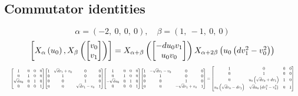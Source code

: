 \documentclass[11pt]{article}
\theoremstyle{definition}
\begin{document}
\subsection{Commutator identities}

\providecommand{\scaletoalign}[2]{%
  \sbox0{$#2$}%
  \ifdim\wd0>#1\relax 
    \resizebox{#1}{!}{\usebox0}%
  \else 
    \usebox0%
  \fi 
}
\[
\alpha = \left( -2, \  0, \  0, \  0\right), \quad \beta = \left( 1, \  -1, \  0, \  0\right)
\]
\[
\scaletoalign{\textwidth}{\left[ X_{\alpha}\left(u_{0}\right), X_{\beta}\left(\left[\begin{matrix}v_{0}\\v_{1}\end{matrix}\right]\right) \right] = X_{\alpha + \beta}\left(\left[\begin{matrix}- d u_{0} v_{1}\\u_{0} v_{0}\end{matrix}\right]\right) X_{\alpha + 2\beta}\left(u_{0} \left(d v_{1}^{2} - v_{0}^{2}\right)\right)}
\]
\[
\scaletoalign{\textwidth}{{\left[\begin{matrix}1 & 0 & 0 & 0\\0 & 1 & 0 & 0\\\sqrt{d} u_{0} & 0 & 1 & 0\\0 & 0 & 0 & 1\end{matrix}\right]} {\left[\begin{matrix}1 & \sqrt{d} v_{1} + v_{0} & 0 & 0\\0 & 1 & 0 & 0\\0 & 0 & 1 & 0\\0 & 0 & \sqrt{d} v_{1} - v_{0} & 1\end{matrix}\right]} {\left[\begin{matrix}1 & 0 & 0 & 0\\0 & 1 & 0 & 0\\- \sqrt{d} u_{0} & 0 & 1 & 0\\0 & 0 & 0 & 1\end{matrix}\right]} {\left[\begin{matrix}1 & - \sqrt{d} v_{1} - v_{0} & 0 & 0\\0 & 1 & 0 & 0\\0 & 0 & 1 & 0\\0 & 0 & - \sqrt{d} v_{1} + v_{0} & 1\end{matrix}\right]} = {\left[\begin{matrix}1 & 0 & 0 & 0\\0 & 1 & 0 & 0\\0 & u_{0} \left(\sqrt{d} v_{0} + d v_{1}\right) & 1 & 0\\u_{0} \left(\sqrt{d} v_{0} - d v_{1}\right) & \sqrt{d} u_{0} \left(d v_{1}^{2} - v_{0}^{2}\right) & 0 & 1\end{matrix}\right]}}
\]
\end{document}
